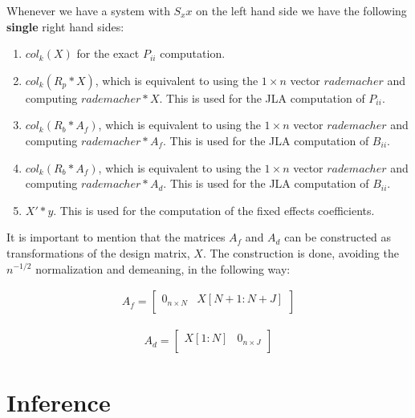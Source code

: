 \documentclass[12pt]{article}
\begin{document}
\clearpage 

Whenever we have a system with $S_xx$ on the left hand side we have the following \textbf{single} right hand sides: 

\begin{enumerate}
    \item $col_k(X)$ for the exact $P_{ii}$ computation.
    \item $col_k(R_p * X)$, which is equivalent to using the $1\times n$ vector $rademacher$ and computing $rademacher * X$. This is used for the JLA computation of $P_{ii}$.
    
    \item $col_k(R_b * A_f)$, which is equivalent to using the $1\times n$ vector $rademacher$ and computing $rademacher * A_f$. This is used for the JLA computation of $B_{ii}$.
    
    \item $col_k(R_b * A_f)$, which is equivalent to using the $1\times n$ vector $rademacher$ and computing $rademacher * A_d$. This is used for the JLA computation of $B_{ii}$.
    
    \item $X'*y$. This is used for the computation of the fixed effects coefficients.
\end{enumerate}

It is important to mention that the matrices $A_f$ and $A_d$ can be constructed as transformations of the design matrix, $X$. The construction is done, avoiding the $n^{-1/2}$ normalization and demeaning, in the following way: 

\begin{align}
    A_f =      \begin{bmatrix}
0_{n \times N} & X[N+1:N+J] \\
\end{bmatrix}   
\end{align}

\begin{align}
A_d  =   \begin{bmatrix}
  X[1:N] & 0_{n \times J} \\
\end{bmatrix}   
\end{align}




\clearpage
\section{Inference}
\end{document}
